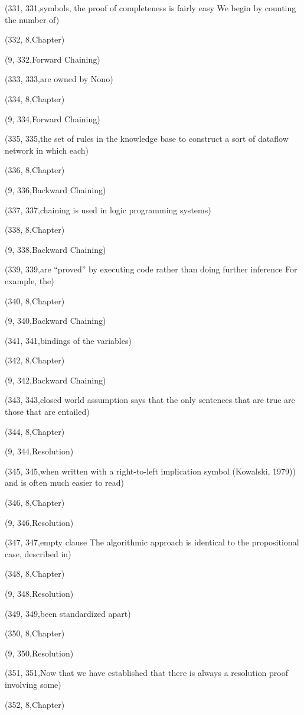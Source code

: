 (331, 331,symbols, the proof of completeness is fairly easy We begin by counting the number of)

(332, 8,Chapter)

(9, 332,Forward Chaining)

(333, 333,are owned by Nono)

(334, 8,Chapter)

(9, 334,Forward Chaining)

(335, 335,the set of rules in the knowledge base to construct a sort of dataﬂow network in which each)

(336, 8,Chapter)

(9, 336,Backward Chaining)

(337, 337,chaining is used in logic programming systems)

(338, 8,Chapter)

(9, 338,Backward Chaining)

(339, 339,are “proved” by executing code rather than doing further inference For example, the)

(340, 8,Chapter)

(9, 340,Backward Chaining)

(341, 341,bindings of the variables)

(342, 8,Chapter)

(9, 342,Backward Chaining)

(343, 343,closed world assumption says that the only sentences that are true are those that are entailed)

(344, 8,Chapter)

(9, 344,Resolution)

(345, 345,when written with a right-to-left implication symbol (Kowalski, 1979)) and is often much easier to read)

(346, 8,Chapter)

(9, 346,Resolution)

(347, 347,empty clause The algorithmic approach is identical to the propositional case, described in)

(348, 8,Chapter)

(9, 348,Resolution)

(349, 349,been standardized apart)

(350, 8,Chapter)

(9, 350,Resolution)

(351, 351,Now that we have established that there is always a resolution proof involving some)

(352, 8,Chapter)

